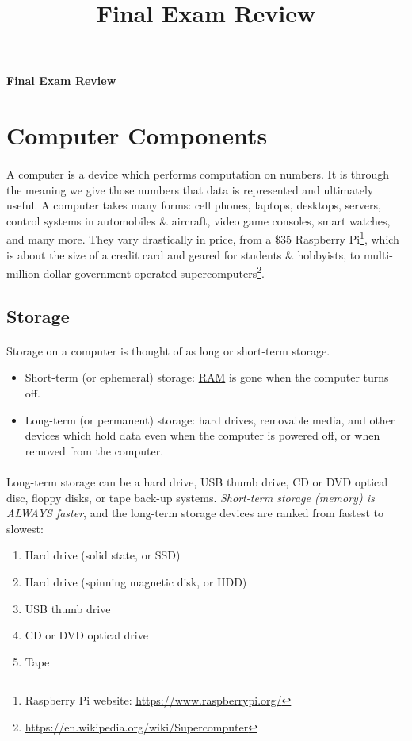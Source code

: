 \documentclass[letter,11pt]{article}
\title{Final Exam Review}
\begin{document}
\huge
\textbf{Final Exam Review}
\normalsize

\tableofcontents

\section{Computer Components}
\paragraph{}A computer is a device which performs computation on numbers. It is through the meaning we give those numbers that data is represented and ultimately useful. A computer takes many forms: cell phones, laptops, desktops, servers, control systems in automobiles \& aircraft, video game consoles, smart watches, and many more. They vary drastically in price, from a \$35 Raspberry Pi\footnote{Raspberry Pi website: \url{https://www.raspberrypi.org/}}, which is about the size of a credit card and geared for students \& hobbyists, to multi-million dollar government-operated supercomputers\footnote{\url{https://en.wikipedia.org/wiki/Supercomputer}}.

\subsection{Storage}
\paragraph{}Storage on a computer is thought of as long or short-term storage.
\begin{itemize}
    \item Short-term (or ephemeral) storage: \hyperref[sec:ram]{RAM} is gone when the computer turns off.
    \item Long-term (or permanent) storage: hard drives, removable media, and other devices which hold data even when the computer is powered off, or when removed from the computer.
\end{itemize}

\paragraph{}Long-term storage can be a hard drive, USB thumb drive, CD or DVD optical disc, floppy disks, or tape back-up systems. \textit{Short-term storage (memory) is ALWAYS faster}, and the long-term storage devices are ranked from fastest to slowest:
\begin{enumerate}
    \item Hard drive (solid state, or SSD)
    \item Hard drive (spinning magnetic disk, or HDD)
    \item USB thumb drive
    \item CD or DVD optical drive
    \item Tape
\end{enumerate}
\end{document}
